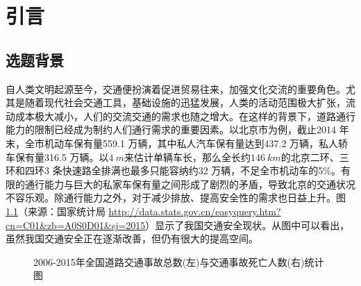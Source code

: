 \chapter{引言}
\label{cha:intro}

\section{选题背景}
\label{sec:background}
自人类文明起源至今，交通便扮演着促进贸易往来，加强文化交流的重要角色。尤其是随着现代社会交通工具，基础设施的迅猛发展，人类的活动范围极大扩张，流动成本极大减小，人们的交流交通的需求也随之增大。在这样的背景下，道路通行能力的限制已经成为制约人们通行需求的重要因素。以北京市为例，截止2014 年末，全市机动车保有量559.1 万辆，其中私人汽车保有量达到437.2 万辆，私人轿车保有量316.5 万辆。以$\SI{4}{m}$来估计单辆车长，那么全长约$\SI{146}{km}$的北京二环、三环和四环3 条快速路全排满也最多只能容纳约32 万辆，不足全市机动车的5\%。有限的通行能力与巨大的私家车保有量之间形成了剧烈的矛盾，导致北京的交通状况不容乐观。除通行能力之外，对于减少排放、提高安全性的需求也日益上升\cite{Ploeg2014Analysis}。图\ref{fig:traffic}（来源：国家统计局 \url{http://data.stats.gov.cn/easyquery.htm?cn=C01&zb=A0S0D01&sj=2015}）显示了我国交通安全现状。从图中可以看出，虽然我国交通安全正在逐渐改善，但仍有很大的提高空间。

\begin{figure}[htbp]
\begin{minipage}[t]{0.4\linewidth}
\centering
{}
\end{minipage}%
\hspace{+2cm}
\begin{minipage}[t]{0.4\linewidth}
\centering
{}
\end{minipage}
\caption[交通事故统计图]{2006-2015年全国道路交通事故总数(左)与交通事故死亡人数(右)统计图}
\label{fig:traffic}
\end{figure}

